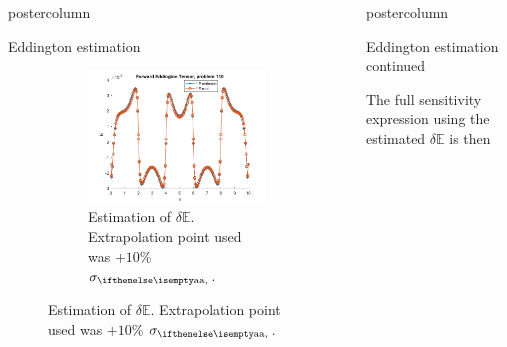 \documentclass[xcolor={usenames,dvipsnames,svgnames,table}]{beamer}
\newcommand{\Edd}{\mathbb{E}}
\newlength{\columnheight}
\begin{document}
\begin{frame}
\begin{columns}
\begin{column}{.33\textwidth}
\begin{beamercolorbox}[center,wd=\textwidth]{postercolumn}
\begin{minipage}[T]{0.95\textwidth}
{\begin{block}{Eddington estimation}
\begin{figure}[H]
\begin{subfigure}{.33\textwidth}
  \includegraphics[width=.98\linewidth]{110deltaE.png}
    \caption{Estimation of $\delta \Edd$. Extrapolation point used was $+10\%$ $\siga$.}
  \label{fig:sfig5}
\end{subfigure}%
\label{fig:fig}
\end{figure}		     
		    	\vfill
			    \end{block}
			    \vfill
			}
			\end{minipage}
		\end{beamercolorbox}
	\end{column}

	\begin{column}{.33\textwidth}
		\begin{beamercolorbox}[center,wd=\textwidth]{postercolumn}
			\begin{minipage}[T]{0.95\textwidth} %
			\parbox[t][\columnheight]{\textwidth}{ %

			    \begin{block}{Eddington estimation continued}

The full sensitivity expression using the estimated $\delta \Edd$ is then


\end{block}}
\end{minipage}
\end{beamercolorbox}
\end{column}
\end{columns}
\end{frame}
\end{document}
